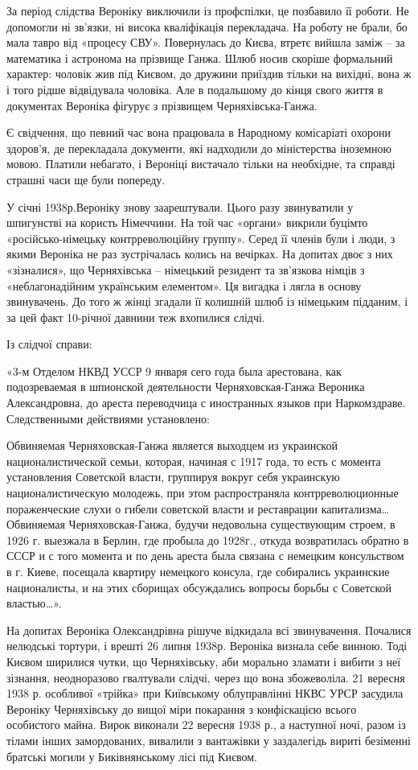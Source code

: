За період слідства Вероніку виключили із профспілки, це позбавило її роботи. Не
допомогли ні зв’язки, ні висока кваліфікація перекладача. На роботу не брали,
бо мала тавро від «процесу СВУ». Повернулась до Києва, втретє вийшла заміж – за
математика і астронома на прізвище Ганжа. Шлюб носив скоріше формальний
характер: чоловік жив під Києвом, до дружини приїздив тільки на вихідні, вона ж
і того рідше відвідувала чоловіка. Але в подальшому до кінця свого життя в
документах Вероніка фігурує з прізвищем Черняхівська-Ганжа. 

Є свідчення, що певний час вона працювала в Народному комісаріаті охорони
здоров’я, де перекладала документи, які надходили до міністерства іноземною
мовою. Платили небагато, і Вероніці вистачало тільки на необхідне, та справді
страшні часи ще були попереду.

У січні 1938р.Вероніку знову заарештували. Цього разу звинуватили у шпигунстві
на користь Німеччини. На той час «органи» викрили буцімто «російсько-німецьку
контрреволюційну группу». Серед її членів були і люди, з якими Вероніка не раз
зустрічалась колись на вечірках. На допитах двоє з них «зізналися», що
Черняхівська – німецький резидент та зв’язкова німців з «неблагонадійним
українським елементом». Ця вигадка і лягла в основу звинувачень. До того ж
жінці згадали її колишній шлюб із німецьким підданим, і за цей факт 10-річної
давнини теж вхопилися слідчі. 

Із слідчої справи: 

«3-м Отделом НКВД УССР 9 января сего года была арестована, как подозреваемая в
шпионской деятельности Черняховская-Ганжа Вероника Александровна, до ареста
переводчица с иностранных языков при Наркомздраве. Следственными действиями
установлено: 

Обвиняемая Черняховская-Ганжа является выходцем из украинской
националистической семьи, которая, начиная с 1917 года, то есть с момента
установления Советской власти, группируя вокруг себя украинскую
националистическую молодежь, при этом распространяла контрреволюционные
пораженческие слухи о гибели советской власти и реставрации капитализма…
Обвиняемая Черняховская-Ганжа, будучи недовольна существующим строем, в 1926 г.
выезжала в Берлин, где пробыла до 1928г., откуда возвратилась обратно в СССР и
с того момента и по день ареста была связана с немецким консульством в г.
Киеве, посещала квартиру немецкого консула, где собирались украинские
националисты, и на этих сборищах обсуждались вопросы борьбы с Советской
властью…».

На допитах Вероніка Олександрівна рішуче відкидала всі звинувачення. Почалися
нелюдські тортури, і врешті 26 липня 1938р. Вероніка визнала себе винною. Тоді
Києвом ширилися чутки, що Черняхівську, аби морально зламати і вибити з неї
зізнання, неодноразово гвалтували слідчі, через що вона збожеволіла. 21 вересня
1938 р. особливої «трійка» при Київському облуправлінні НКВС УРСР  засудила
Вероніку Черняхівську до вищої міри покарання з конфіскацією всього особистого
майна. Вирок виконали 22 вересня 1938 р., а наступної ночі, разом із тілами
інших замордованих, вивалили з вантажівки у заздалегідь вириті безіменні
братські могили у Биківнянському лісі під Києвом.

